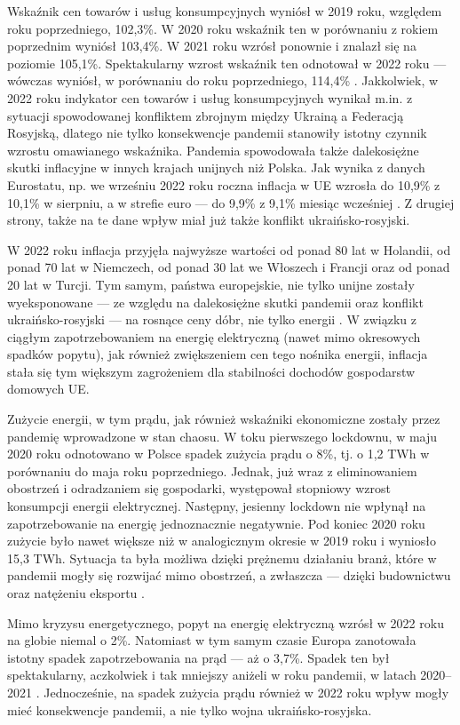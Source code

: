 \documentclass[polish, twoside, 12pt, a4paper]{article}
\theoremstyle{definition}
\theoremstyle{plain}
\theoremstyle{remark}
\begin{document}
Wskaźnik cen towarów i usług konsumpcyjnych wyniósł w 2019 roku, względem roku poprzedniego, 102,3\%. W 2020 roku wskaźnik ten w porównaniu z rokiem poprzednim wyniósł 103,4\%. W 2021 roku wzrósł ponownie i znalazł się na poziomie 105,1\%. Spektakularny wzrost wskaźnik ten odnotował w 2022 roku --- wówczas wyniósł, w porównaniu do roku poprzedniego, 114,4\% \citep{gus2023}. Jakkolwiek, w 2022 roku indykator cen towarów i usług konsumpcyjnych wynikał m.in. z sytuacji spowodowanej konfliktem zbrojnym między Ukrainą a Federacją Rosyjską, dlatego nie tylko konsekwencje pandemii stanowiły istotny czynnik wzrostu omawianego wskaźnika. Pandemia spowodowała także dalekosiężne skutki inflacyjne w innych krajach unijnych niż Polska. Jak wynika z danych Eurostatu, np. we wrześniu 2022 roku roczna inflacja w UE wzrosła do 10,9\% z 10,1\% w sierpniu, a w strefie euro --- do 9,9\% z 9,1\% miesiąc wcześniej \citep{rp2022}. Z drugiej strony, także na te dane wpływ miał już także konflikt ukraińsko-rosyjski. 

W 2022 roku inflacja przyjęła najwyższe wartości od ponad 80 lat w Holandii, od ponad 70 lat w Niemczech, od ponad 30 lat we Włoszech i Francji oraz od ponad 20 lat w Turcji. Tym samym, państwa europejskie, nie tylko unijne zostały wyeksponowane --- ze względu na dalekosiężne skutki pandemii oraz konflikt ukraińsko-rosyjski --- na rosnące ceny dóbr, nie tylko energii \citep{infor2022}. W związku z ciągłym zapotrzebowaniem na energię elektryczną (nawet mimo okresowych spadków popytu), jak również zwiększeniem cen tego nośnika energii, inflacja stała się tym większym zagrożeniem dla stabilności dochodów gospodarstw domowych UE. 

Zużycie energii, w tym prądu, jak również wskaźniki ekonomiczne zostały przez pandemię wprowadzone w stan chaosu. W toku pierwszego lockdownu, w maju 2020 roku odnotowano w Polsce spadek zużycia prądu o 8\%, tj. o 1,2 TWh w porównaniu do maja roku poprzedniego. Jednak, już wraz z eliminowaniem obostrzeń i odradzaniem się gospodarki, występował stopniowy wzrost konsumpcji energii elektrycznej. Następny, jesienny lockdown nie wpłynął na zapotrzebowanie na energię jednoznacznie negatywnie. Pod koniec 2020 roku zużycie było nawet większe niż w analogicznym okresie w 2019 roku i wyniosło 15,3 TWh. Sytuacja ta była możliwa dzięki prężnemu działaniu branż, które w pandemii mogły się rozwijać mimo obostrzeń, a zwłaszcza --- dzięki budownictwu oraz natężeniu eksportu \citep{tygodnikprzeglad2021}. 

Mimo kryzysu energetycznego, popyt na energię elektryczną wzrósł w 2022 roku na globie niemal o 2\%. Natomiast w tym samym czasie Europa zanotowała istotny spadek zapotrzebowania na prąd --- aż o 3,7\%. Spadek ten był spektakularny, aczkolwiek i tak mniejszy aniżeli w roku pandemii, w latach 2020--2021 \citep{maciuch2023}. Jednocześnie, na spadek zużycia prądu również w 2022 roku wpływ mogły mieć konsekwencje pandemii, a nie tylko wojna ukraińsko-rosyjska. 
\end{document}
